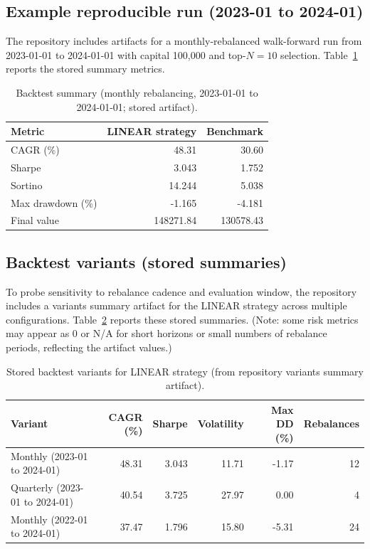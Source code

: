 \documentclass{svproc}
\begin{document}
\subsection{Example reproducible run (2023-01 to 2024-01)}\label{sec:run}
The repository includes artifacts for a monthly-rebalanced walk-forward run from 2023-01-01 to 2024-01-01 with capital 100,000 and top-$N=10$ selection. Table~\ref{tab:backtest_summary} reports the stored summary metrics.

\begin{table}[h!]
\centering
\caption{Backtest summary (monthly rebalancing, 2023-01-01 to 2024-01-01; stored artifact).}
\label{tab:backtest_summary}
\begin{tabular}{|l|r|r|}
\hline
Metric & LINEAR strategy & Benchmark \\
\hline
CAGR (\%) & 48.31 & 30.60 \\
Sharpe & 3.043 & 1.752 \\
Sortino & 14.244 & 5.038 \\
Max drawdown (\%) & -1.165 & -4.181 \\
Final value & 148271.84 & 130578.43 \\
\hline
\end{tabular}
\end{table}

\subsection{Backtest variants (stored summaries)}\label{sec:variants}
To probe sensitivity to rebalance cadence and evaluation window, the repository includes a variants summary artifact for the LINEAR strategy across multiple configurations. Table~\ref{tab:variants} reports these stored summaries. (Note: some risk metrics may appear as 0 or N/A for short horizons or small numbers of rebalance periods, reflecting the artifact values.)

\begin{table}[h!]
\centering
\caption{Stored backtest variants for LINEAR strategy (from repository variants summary artifact).}
\label{tab:variants}
\begin{tabular}{|p{4.0cm}|r|r|r|r|r|}
\hline
Variant & CAGR (\%) & Sharpe & Volatility & Max DD (\%) & Rebalances \\
\hline
Monthly (2023-01 to 2024-01) & 48.31 & 3.043 & 11.71 & -1.17 & 12 \\
Quarterly (2023-01 to 2024-01) & 40.54 & 3.725 & 27.97 & 0.00 & 4 \\
Monthly (2022-01 to 2024-01) & 37.47 & 1.796 & 15.80 & -5.31 & 24 \\
\hline
\end{tabular}
\end{table}
\end{document}
